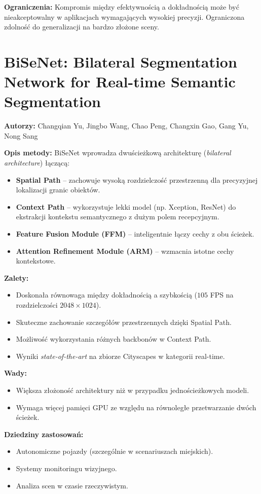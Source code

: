 \textbf{Ograniczenia:}
Kompromis między efektywnością a dokładnością może być nieakceptowalny w aplikacjach wymagających wysokiej precyzji. Ograniczona zdolność do generalizacji na bardzo złożone sceny.

\section{BiSeNet: Bilateral Segmentation Network for Real-time Semantic Segmentation}
\textbf{Autorzy:} Changqian Yu, Jingbo Wang, Chao Peng, Changxin Gao, Gang Yu, Nong Sang

\textbf{Opis metody:}
BiSeNet wprowadza dwuścieżkową architekturę (\textit{bilateral architecture}) łączącą:
\begin{itemize}
    \item \textbf{Spatial Path} -- zachowuje wysoką rozdzielczość przestrzenną dla precyzyjnej lokalizacji granic obiektów.
    \item \textbf{Context Path} -- wykorzystuje lekki model (np. Xception, ResNet) do ekstrakcji kontekstu semantycznego z dużym polem recepcyjnym.
    \item \textbf{Feature Fusion Module (FFM)} -- inteligentnie łączy cechy z obu ścieżek.
    \item \textbf{Attention Refinement Module (ARM)} -- wzmacnia istotne cechy kontekstowe.
\end{itemize}

\textbf{Zalety:}
\begin{itemize}
    \item Doskonała równowaga między dokładnością a szybkością ($105$ FPS na rozdzielczości $2048\times1024$).
    \item Skuteczne zachowanie szczegółów przestrzennych dzięki Spatial Path.
    \item Możliwość wykorzystania różnych backbonów w Context Path.
    \item Wyniki \textit{state-of-the-art} na zbiorze Cityscapes w kategorii real-time.
\end{itemize}

\textbf{Wady:}
\begin{itemize}
    \item Większa złożoność architektury niż w przypadku jednościeżkowych modeli.
    \item Wymaga więcej pamięci GPU ze względu na równoległe przetwarzanie dwóch ścieżek.
\end{itemize}

\textbf{Dziedziny zastosowań:}
\begin{itemize}
    \item Autonomiczne pojazdy (szczególnie w scenariuszach miejskich).
    \item Systemy monitoringu wizyjnego.
    \item Analiza scen w czasie rzeczywistym.
\end{itemize}

